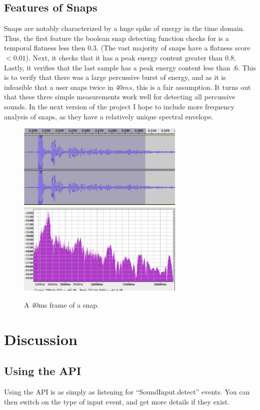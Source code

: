\documentclass[DIV=calc, paper=a4, fontsize=11pt, twocolumn]{scrartcl}   %
\begin{document}
   \subsection{Features of Snaps}

   Snaps are notably characterized by a huge spike of energy in the time domain. Thus, the first feature the boolean snap detecting function checks for is a temporal flatness less then $0.3$. (The vast majority of snaps have a flatness score $<0.01$). Next, it checks that it has a peak energy content greater than $0.8$. Lastly, it verifies that the last sample has a peak energy content less than $.6$. This is to verify that there was a large percussive burst of energy, and as it is infeasible that a user snaps twice in $40ms$, this is a fair assumption. It turns out that these three simple measurements work well for detecting all percussive sounds. In the next version of the project I hope to include more frequency analysis of snaps, as they have a relatively unique spectral envelope.



    \begin{figure}[h]
   \centering
   \includegraphics[width=80mm]{figures/snapTimeDomainFrame.png}
   \includegraphics[width=80mm]{figures/SnapFreqDomainFrame.png}
   \caption{A 40ms frame of a snap. }
   \label{overflow}

\end{figure}


\section{Discussion}
   \subsection{Using the API}
      Using the API is as simply as listening for ``SoundInput.detect'' events. You can then switch on the type of input event, and get more details if they exist.
\end{document}
